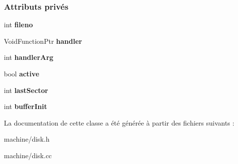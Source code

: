 \subsubsection*{Attributs privés}
\begin{DoxyCompactItemize}
\item 
\hypertarget{class_disk_a27881148b34cffd7005df5d7353ce775}{}\label{class_disk_a27881148b34cffd7005df5d7353ce775} 
int {\bfseries fileno}
\item 
\hypertarget{class_disk_aa7ff4bb271805d97872bd0022a8c61a3}{}\label{class_disk_aa7ff4bb271805d97872bd0022a8c61a3} 
Void\+Function\+Ptr {\bfseries handler}
\item 
\hypertarget{class_disk_a8433930b7bd06c6011ae15daca656516}{}\label{class_disk_a8433930b7bd06c6011ae15daca656516} 
int {\bfseries handler\+Arg}
\item 
\hypertarget{class_disk_a41ece24e9dead4ad0af20607d3ac4934}{}\label{class_disk_a41ece24e9dead4ad0af20607d3ac4934} 
bool {\bfseries active}
\item 
\hypertarget{class_disk_a09339a72e2d38a32238934f0ae2ae1bb}{}\label{class_disk_a09339a72e2d38a32238934f0ae2ae1bb} 
int {\bfseries last\+Sector}
\item 
\hypertarget{class_disk_a90d96204820fdafec55af216ef9bf023}{}\label{class_disk_a90d96204820fdafec55af216ef9bf023} 
int {\bfseries buffer\+Init}
\end{DoxyCompactItemize}


La documentation de cette classe a été générée à partir des fichiers suivants \+:\begin{DoxyCompactItemize}
\item 
machine/disk.\+h\item 
machine/disk.\+cc\end{DoxyCompactItemize}
